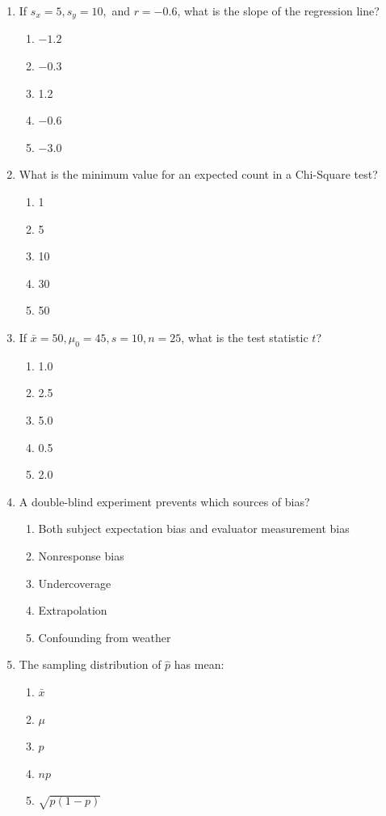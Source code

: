\begin{enumerate}[resume, leftmargin=1.5em]
  \item If $s_x = 5, s_y = 10,$ and $r = -0.6$, what is the slope of the regression line?
  \begin{enumerate}[label=(\Alph*)]
    \item $-1.2$ \item $-0.3$ \item 1.2 \item $-0.6$ \item $-3.0$
  \end{enumerate}

  \item What is the minimum value for an expected count in a Chi-Square test?
  \begin{enumerate}[label=(\Alph*)]
    \item 1 \item 5 \item 10 \item 30 \item 50
  \end{enumerate}

  \item If $\bar{x} = 50, \mu_0 = 45, s = 10, n = 25$, what is the test statistic $t$?
  \begin{enumerate}[label=(\Alph*)]
    \item 1.0 \item 2.5 \item 5.0 \item 0.5 \item 2.0
  \end{enumerate}

  \item A double-blind experiment prevents which sources of bias?
  \begin{enumerate}[label=(\Alph*)]
    \item Both subject expectation bias and evaluator measurement bias \item Nonresponse bias \item Undercoverage \item Extrapolation \item Confounding from weather
  \end{enumerate}

  \item The sampling distribution of $\hat{p}$ has mean:
  \begin{enumerate}[label=(\Alph*)]
    \item $\bar{x}$ \item $\mu$ \item $p$ \item $np$ \item $\sqrt{p(1-p)}$
  \end{enumerate}


\end{enumerate}
